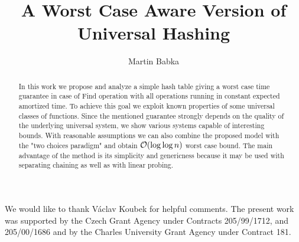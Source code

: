 \documentclass{article}
\begin{document}
\title{A Worst Case Aware Version of Universal Hashing}

\author{Martin Babka}


\begin{abstract}
In this work we propose and analyze a simple hash table giving a worst case time guarantee in case of Find operation with all operations running in constant expected amortized time.
To achieve this goal we exploit known properties of some universal classes of functions.
Since the mentioned guarantee strongly depends on the quality of the underlying universal system, we show various systems capable of interesting bounds.
With reasonable assumptions we can also combine the proposed model with the "two choices paradigm" and obtain $\mathcal{O}(\log \log n)$ worst case bound.
The main advantage of the method is its simplicity and genericness because it may be used with separating chaining as well as with linear probing.
\end{abstract}

\begin{article}






\acknowledgments %
{We would like to thank Václav Koubek for helpful comments.
The  present  work  was  supported by
the Czech  Grant  Agency  under  Contracts  205/99/1712, and
205/00/1686 and by the Charles University Grant Agency under
Contract 181.}



\end{article}
\end{document}
